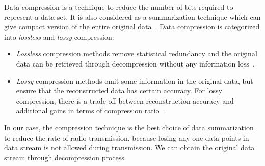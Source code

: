 Data compression is a technique to reduce the number of bits required to
represent a data set. It is also considered as a summarization technique
which can give compact version of the entire original
data~\cite{hesabi2015data}. Data compression is categorized into
\emph{lossless} and \emph{lossy} compression:
\begin{itemize}
    \item \emph{Lossless} compression methods remove statistical redundancy and
    the original data can be retrieved through decompression without any
    information loss~\cite{hesabi2015data}.
    \item \emph{Lossy} compression methods omit some information in the original
    data, but ensure that the reconstructed data has certain accuracy. For lossy
    compression, there is a trade-off between reconstruction accuracy and
    additional gains in terms of compression ratio~\cite{zordan2014performance}.
\end{itemize}

In our case, the compression technique is the best choice of data summarization
to reduce the rate of radio transmission, because losing any one data points in
data stream is not allowed during transmission. We can obtain the original data
stream through decompression process. 

